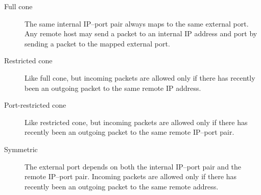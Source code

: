 \documentclass[letterpaper,twocolumn]{article}
\begin{document}
\begin{description}
\item[Full cone]
The same internal IP--port pair always maps to the same external port.
Any remote host may send a packet to an internal IP address and port by sending a packet to the
mapped external port.
\item[Restricted cone]
Like full cone,
but incoming packets
are allowed only if
there has recently been an outgoing packet
to the same remote IP address.
\item[Port-restricted cone]
Like restricted cone,
but incoming packets are allowed only if
there has recently been an outgoing packet
to the same remote IP--port pair.
\item[Symmetric]
The external port depends on both
the internal IP--port pair and the remote IP--port pair.
Incoming packets are allowed only if
there has recently been an outgoing
packet to the same remote address.
\end{description}
\end{document}
